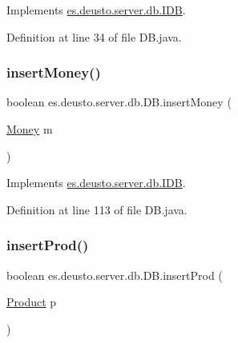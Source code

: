Implements \hyperlink{interfacees_1_1deusto_1_1server_1_1db_1_1_i_d_b_aba694290fde102c2eed31e505dd257fb}{es.\+deusto.\+server.\+db.\+I\+DB}.



Definition at line 34 of file D\+B.\+java.

\mbox{\label{classes_1_1deusto_1_1server_1_1db_1_1_d_b_ab9a9acacfc8dadaeec7159c0886dfec2}} 
\subsubsection{\texorpdfstring{insert\+Money()}{insertMoney()}}
{\footnotesize\ttfamily boolean es.\+deusto.\+server.\+db.\+D\+B.\+insert\+Money (\begin{DoxyParamCaption}\item[{\hyperlink{classes_1_1deusto_1_1server_1_1db_1_1data_1_1_money}{Money}}]{m }\end{DoxyParamCaption})}



Implements \hyperlink{interfacees_1_1deusto_1_1server_1_1db_1_1_i_d_b_afcce296d82fa0a6fb8083215b3647663}{es.\+deusto.\+server.\+db.\+I\+DB}.



Definition at line 113 of file D\+B.\+java.

\mbox{\label{classes_1_1deusto_1_1server_1_1db_1_1_d_b_a2f5a50ff22834658b641ebf6bb7afbe6}} 
\subsubsection{\texorpdfstring{insert\+Prod()}{insertProd()}}
{\footnotesize\ttfamily boolean es.\+deusto.\+server.\+db.\+D\+B.\+insert\+Prod (\begin{DoxyParamCaption}\item[{\hyperlink{classes_1_1deusto_1_1server_1_1db_1_1data_1_1_product}{Product}}]{p }\end{DoxyParamCaption})}



